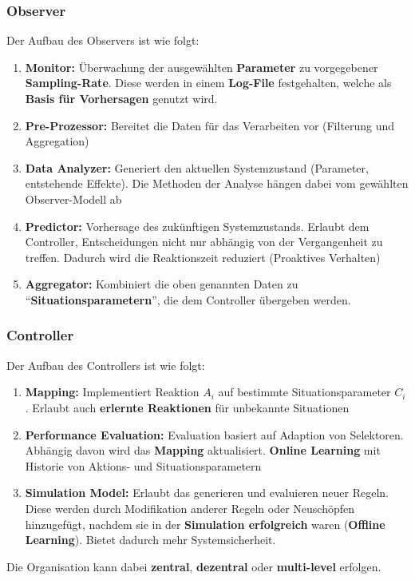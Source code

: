 \documentclass[a4paper]{article}
\begin{document}
\subsubsection{Observer}
Der Aufbau des Observers ist wie folgt:
\begin{enumerate}
	\item \textbf{Monitor:} Überwachung der ausgewählten \textbf{Parameter} zu vorgegebener\textbf{ Sampling-Rate}. Diese werden in einem \textbf{Log-File} festgehalten, welche als \textbf{Basis für Vorhersagen} genutzt wird.
	\item \textbf{Pre-Prozessor:} Bereitet die Daten für das Verarbeiten vor (Filterung und Aggregation)
	\item \textbf{Data Analyzer:} Generiert den aktuellen Systemzustand (Parameter, entstehende Effekte). Die Methoden der Analyse hängen dabei vom gewählten Observer-Modell ab
	\item \textbf{Predictor:} Vorhersage des zukünftigen Systemzustands. Erlaubt dem Controller, Entscheidungen nicht nur abhängig von der Vergangenheit zu treffen. Dadurch wird die Reaktionszeit reduziert (Proaktives Verhalten)
	\item \textbf{Aggregator:} Kombiniert die oben genannten Daten zu ``\textbf{Situationsparametern}'', die dem Controller übergeben werden.
	
\end{enumerate}
\subsubsection{Controller}
Der Aufbau des Controllers ist wie folgt:
\begin{enumerate}
	\item \textbf{Mapping:} Implementiert Reaktion $A_i$ auf bestimmte Situationsparameter $C_i$. Erlaubt auch \textbf{erlernte Reaktionen} für unbekannte Situationen
	\item \textbf{Performance Evaluation:} Evaluation basiert auf Adaption von Selektoren. Abhängig davon wird das \textbf{Mapping} aktualisiert. \textbf{Online Learning} mit Historie von Aktions- und Situationsparametern
	\item \textbf{Simulation Model:} Erlaubt das generieren und evaluieren neuer Regeln. Diese werden durch Modifikation anderer Regeln oder Neuschöpfen hinzugefügt, nachdem sie in der \textbf{Simulation erfolgreich} waren (\textbf{Offline Learning}). Bietet dadurch mehr Systemsicherheit.
\end{enumerate}
Die Organisation kann dabei \textbf{zentral}, \textbf{dezentral} oder\textbf{ multi-level} erfolgen.
\end{document}
